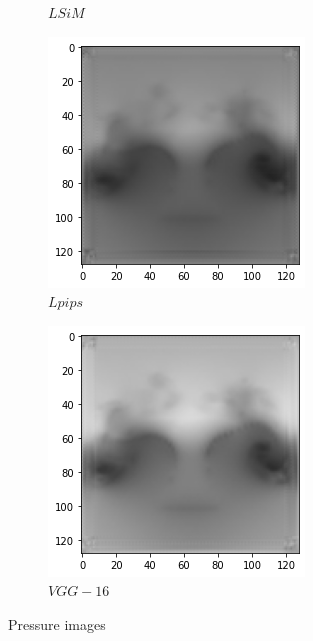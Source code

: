 \documentclass[a4paper,12pt,twoside]{report}
\begin{document}
\begin{figure}
\begin{subfigure}{0.19\textwidth}
		\caption{$LSiM$}
	\end{subfigure}
	\begin{subfigure}{0.19\textwidth}
		\centering
		\includegraphics[scale=0.29]{autoencoder/lpips1.png}
		\caption{$Lpips$}
	\end{subfigure}
	\begin{subfigure}{0.19\textwidth}
		\centering
		\includegraphics[scale=0.29]{autoencoder/vgg1.png}
		\caption{$VGG-16$}
	\end{subfigure}
	\caption{Pressure images}
\end{figure}
\end{document}
